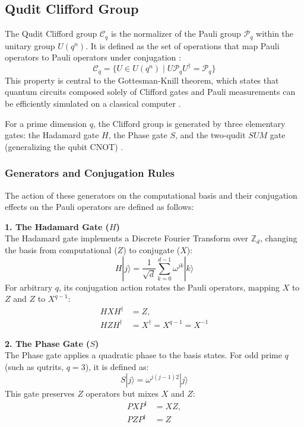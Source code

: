 \subsection{Qudit Clifford Group}

The Qudit Clifford group $\mathcal{C}_q$ is the normalizer of the Pauli group $\mathcal{P}_q$ within the unitary group $U(q^n)$. It is defined as the set of operations that map Pauli operators to Pauli operators under conjugation \cite{Gottesman1999}:
\begin{equation}
    \mathcal{C}_q = \{ U \in U(q^n) \mid U \mathcal{P}_q U^\dagger = \mathcal{P}_q \}
\end{equation}
This property is central to the Gottesman-Knill theorem, which states that quantum circuits composed solely of Clifford gates and Pauli measurements can be efficiently simulated on a classical computer \cite{Gottesman1998}.

For a prime dimension $q$, the Clifford group is generated by three elementary gates: the Hadamard gate $H$, the Phase gate $S$, and the two-qudit $SUM$ gate (generalizing the qubit CNOT) \cite{Hostens2005}.

\subsubsection{Generators and Conjugation Rules}
The action of these generators on the computational basis and their conjugation effects on the Pauli operators are defined as follows:

\textbf{1. The Hadamard Gate ($H$)} \\
The Hadamard gate implements a Discrete Fourier Transform over $\mathbb{Z}_d$, changing the basis from computational ($Z$) to conjugate ($X$):
\begin{equation}
    H |j\rangle = \frac{1}{\sqrt{d}} \sum_{k=0}^{d-1} \omega^{jk} |k\rangle
\end{equation}
For arbitrary $q$, its conjugation action rotates the Pauli operators, mapping $X$ to $Z$ and $Z$ to $X^{q-1}$:
\begin{align}
    H X H^\dagger &= Z, \\
    H Z H^\dagger &= X^\dagger = X^{q-1} = X^{-1}
\end{align}

\textbf{2. The Phase Gate ($S$)} \\
The Phase gate applies a quadratic phase to the basis states. For odd prime $q$ (such as qutrits, $q=3$), it is defined as:
\begin{equation}
    S |j\rangle = \omega^{j(j-1)2} |j\rangle
\end{equation}
This gate preserves $Z$ operators but mixes $X$ and $Z$:
\begin{align}
    P X P^\dagger &= X Z, \\
    P Z P^\dagger &= Z
\end{align}


